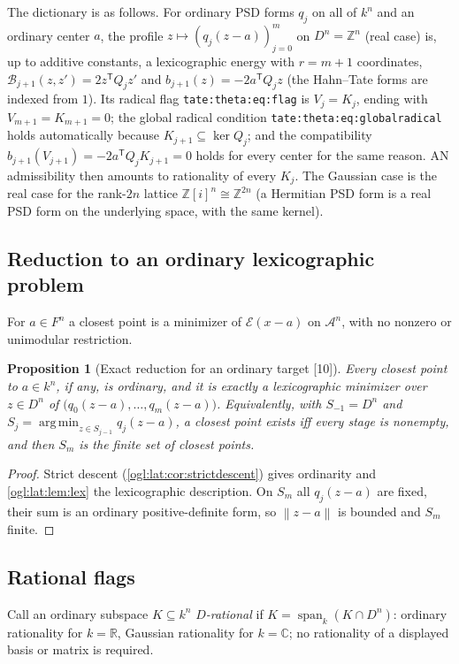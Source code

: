 \documentclass[11pt,oneside]{article}
\numberwithin{equation}{section}
\newtheorem{proposition}[proposition]{Proposition}
\theoremstyle{definition}
\theoremstyle{remark}
\newcommand{\Z}{\mathbb Z}
\newcommand{\R}{\mathbb R}
\newcommand{\C}{\mathbb C}
\newcommand{\A}{\mathcal A}
\newcommand{\cE}{\mathcal E}
\newcommand{\cB}{\mathcal B}
\newcommand{\Span}{\operatorname{span}}
\newcommand{\argmin}{\operatorname*{arg\,min}}
\newcommand{\norm}[1]{\left\lVert #1\right\rVert}
\newcommand{\src}[1]{\textup{\textsf{\small[#1]}}}
\newcommand{\replabel}[1]{\nolinkurl{#1}}
\begin{document}
The dictionary is as follows. For ordinary PSD forms $q_j$ on all of $k^n$ and an
ordinary center $a$, the profile $z\mapsto(q_j(z-a))_{j=0}^m$ on $D^n=\Z^n$ (real
case) is, up to additive constants, a lexicographic energy with $r=m+1$
coordinates, $\cB_{j+1}(z,z')=2z^{\mathsf T}Q_jz'$ and
$b_{j+1}(z)=-2a^{\mathsf T}Q_jz$ (the Hahn--Tate forms are indexed from $1$). Its
radical flag \replabel{tate:theta:eq:flag} is $V_j=K_j$, ending with
$V_{m+1}=K_{m+1}=0$; the global radical condition
\replabel{tate:theta:eq:globalradical} holds automatically because
$K_{j+1}\subseteq\ker Q_j$; and the compatibility
$b_{j+1}(V_{j+1})=-2a^{\mathsf T}Q_jK_{j+1}=0$ holds for every center for the same
reason. AN admissibility then amounts to rationality of every $K_j$. The Gaussian case is
the real case for the rank-$2n$ lattice $\Z[i]^n\cong\Z^{2n}$ (a Hermitian PSD form
is a real PSD form on the underlying space, with the same kernel).

\subsection{Reduction to an ordinary lexicographic problem}

For $a\in F^n$ a closest point is a minimizer of $\cE(x-a)$ on $\A^n$, with no
nonzero or unimodular restriction.

\begin{proposition}[Exact reduction for an ordinary target \src{10}]\label{ogl:lat:prop:closest}
Every closest point to $a\in k^n$, if any, is ordinary, and it is exactly a
lexicographic minimizer over $z\in D^n$ of $\bigl(q_0(z-a),\dots,q_m(z-a)\bigr)$.
Equivalently, with $S_{-1}=D^n$ and $S_j=\argmin_{z\in S_{j-1}}q_j(z-a)$, a
closest point exists iff every stage is nonempty, and then $S_m$ is the finite
set of closest points.
\end{proposition}
\begin{proof}
Strict descent (\cref{ogl:lat:cor:strictdescent}) gives ordinarity and
\cref{ogl:lat:lem:lex} the lexicographic description. On $S_m$ all $q_j(z-a)$
are fixed, their sum is an ordinary positive-definite form, so $\norm{z-a}$ is
bounded and $S_m$ finite.
\end{proof}

\subsection{Rational flags}

Call an ordinary subspace $K\subseteq k^n$ \emph{$D$-rational} if
$K=\Span_k(K\cap D^n)$: ordinary rationality for $k=\R$, Gaussian rationality
for $k=\C$; no rationality of a displayed basis or matrix is required.
\end{document}

